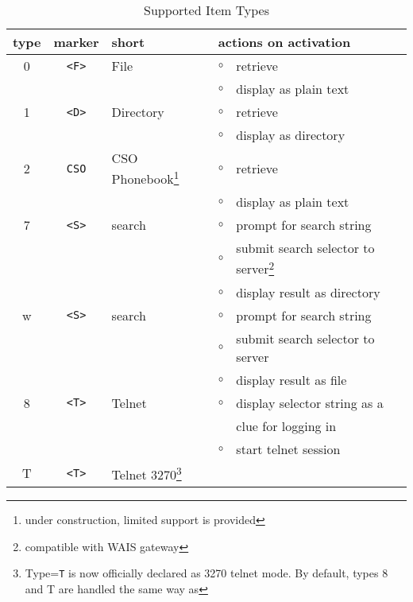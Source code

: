\begin{table}
\caption{Supported Item Types}\label{supported.items}
\rule{0mm}{2mm}
\begin{minipage}{\textwidth}
\begin{center}
\begin{tabular}{|c|c|l|cl|}\hline
type & marker & short           &\multicolumn{2}{l|}{actions on activation}\\
\hline\hline
0    & \verb/<F>/& File            & $\circ$ & retrieve                        \\
     &        &                 & $\circ$ & display as plain text           \\
\hline
1    & \verb/<D>/& Directory       & $\circ$ & retrieve                        \\
     &        &                 & $\circ$ & display as directory            \\
\hline
2    & \verb/CSO/    & CSO Phonebook\footnote{under construction,
  limited support is provided} & $\circ$ & retrieve \\
     &        &                 & $\circ$ & display as plain text           \\
\hline
7    & \verb/<S>/& search          & $\circ$ & prompt for search string        \\
     &        &                 & $\circ$ & submit search selector to
                               server\footnote{compatible with WAIS gateway}\\
     &        &                 & $\circ$ & display result as directory     \\
\hline
w    & \verb/<S>/& search          & $\circ$ & prompt for search string        \\
     &        &                 & $\circ$ & submit search selector to server\\
     &        &                 & $\circ$ & display result as file          \\
\hline
8    & \verb/<T>/& Telnet          & $\circ$ & display selector string as a    \\
     &        &                 &         & clue for logging in             \\
     &        &                 & $\circ$ & start telnet session            \\
\hline
T    & \verb/<T>/& Telnet 3270\footnote{Type={\tt T} is now officially declared
as 3270 telnet mode.  By default, types 8 and T are handled the same way as
}
\end{tabular}
\end{center}
\end{minipage}
\end{table}
